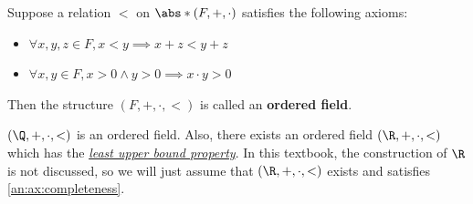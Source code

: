 \bigskip

\begin{definition} \label{an:def:ordered-field}
  Suppose a relation $<$ on $\abs*{(F, +, \cdot)}$ satisfies the following axioms:
  \begin{itemize}
    \item $\forall x, y, z \in F, x < y \implies x + z < y + z$
    \item $\forall x, y \in F, x > 0 \land y > 0 \implies x \cdot y > 0$
  \end{itemize}
  Then the structure $(F, +, \cdot, <)$ is called an \textbf{ordered field}.
\end{definition}

\bigskip

\begin{remark}
  $(\Q, +, \cdot, <)$ is an ordered field. Also, there exists an ordered field $(\R, +, \cdot, <)$
  which has the \hyperref[an:def:least-upper-bound-property]{\emph{least upper bound property}}. In this textbook,
  the construction of $\R$ is not discussed, so we will just assume that $(\R, +, \cdot, <)$ exists and
  satisfies \cref{an:ax:completeness}.
\end{remark}
